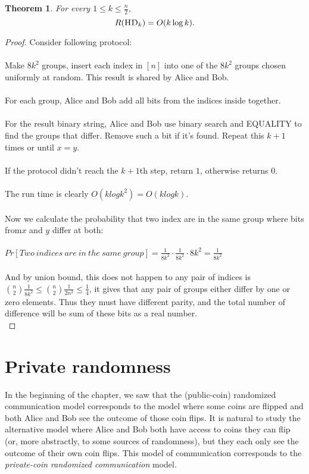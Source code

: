 \documentclass[11pt,oneside]{book}
\theoremstyle{plain}
\newtheorem{theorem}{Theorem}
\theoremstyle{definition}
\theoremstyle{plain}
\newcommand{\HD}{\textsc{HD}}
\begin{document}
\begin{theorem}
	For every $1 \le k \le \frac n2$,
	\[
	R(\HD_k) = O( k \log k).
	\]
\end{theorem}

\begin{proof}
	Consider following protocol:\\
	\\
	Make $8k^2$ groups, insert each index in $[n]$ into one of the $8k^2$ groups chosen uniformly at random. This result is shared by Alice and Bob.\\
	\\
	For each group, Alice and Bob add all bits from the indices inside together.\\
	\\
	For the result binary string, Alice and Bob use binary search and EQUALITY to find the groups that differ. Remove such a bit if it's found. Repeat this $k+1$ times or until $x=y$.\\
	\\
	If the protocol didn't reach the $k+1$th step, return $1$, otherwise returns 0.\\
	\\
	The run time is clearly $O(klogk^2) = O(klogk)$.\\
	\\
	Now we calculate the probability that two index are in the same group where bits from$x$ and $y$ differ at both: \\
	\\
	$Pr[Two\ indices\ are\ in\ the\ same\ group] = \frac{1}{8k^2}\cdot\frac{1}{8k^2}\cdot8k^2 = \frac{1}{8k^2}$ \\
	\\
	And by union bound, this does not happen to any pair of indices is $\binom{n}{2}\frac{1}{8k^2} \leq \binom{n}{2}\frac{1}{2n^2} \leq \frac14$, it gives that any pair of groups either differ by one or zero elements. Thus they must have different parity, and the total number of difference will be sum of these bits as a real number. \\
\end{proof}


 
\section{Private randomness}

In the beginning of the chapter, we saw that the (public-coin) randomized communication model corresponds to the model where some coins are flipped and both Alice and Bob see the outcome of those coin flips. It is natural to study the alternative model where Alice and Bob both have access to coins they can flip (or, more abstractly, to some sources of randomness), but they each only see the outcome of their own coin flips. This model of communication corresponds to the \emph{private-coin randomized communication} model.
\end{document}
